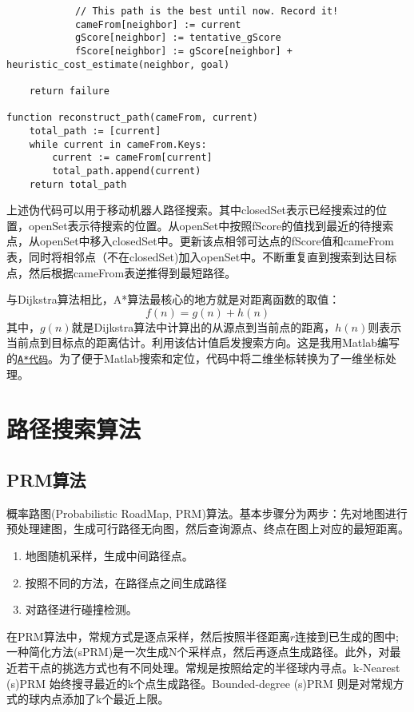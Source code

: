 \begin{lstlisting}
            // This path is the best until now. Record it!
            cameFrom[neighbor] := current
            gScore[neighbor] := tentative_gScore
            fScore[neighbor] := gScore[neighbor] + heuristic_cost_estimate(neighbor, goal) 

    return failure

function reconstruct_path(cameFrom, current)
    total_path := [current]
    while current in cameFrom.Keys:
        current := cameFrom[current]
        total_path.append(current)
    return total_path
\end{lstlisting}
上述伪代码可以用于移动机器人路径搜索。其中closedSet表示已经搜索过的位置，openSet表示待搜索的位置。从openSet中按照fScore的值找到最近的待搜索点，从openSet中移入closedSet中。更新该点相邻可达点的fScore值和cameFrom表，同时将相邻点（不在closedSet)加入openSet中。不断重复直到搜索到达目标点，然后根据cameFrom表逆推得到最短路径。

与Dijkstra算法相比，A*算法最核心的地方就是对距离函数的取值：
\begin{equation*}
	f(n) = g(n) + h(n)
\end{equation*}
其中，$g(n)$就是Dijkstra算法中计算出的从源点到当前点的距离，$h(n)$则表示当前点到目标点的距离估计。利用该估计值启发搜索方向。这是我用Matlab编写的\href{/attachment/myastar.m}{\texttt{A*代码}}。为了便于Matlab搜索和定位，代码中将二维坐标转换为了一维坐标处理。

\section{路径搜索算法}
\subsection{PRM算法}
概率路图(Probabilistic RoadMap, PRM)算法。基本步骤分为两步：先对地图进行预处理建图，生成可行路径无向图，然后查询源点、终点在图上对应的最短距离。


\begin{enumerate}
\item 地图随机采样，生成中间路径点。
\item 按照不同的方法，在路径点之间生成路径
\item 对路径进行碰撞检测。
\end{enumerate}

在PRM算法中，常规方式是逐点采样，然后按照半径距离$r$连接到已生成的图中;一种简化方法(sPRM)是一次生成N个采样点，然后再逐点生成路径。此外，对最近若干点的挑选方式也有不同处理。常规是按照给定的半径球内寻点。k-Nearest (s)PRM 始终搜寻最近的k个点生成路径。Bounded-degree (s)PRM 则是对常规方式的球内点添加了k个最近上限。


